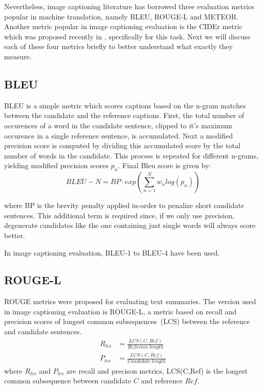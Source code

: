 Nevertheless, image captioning literature has borrowed three evaluation metrics
popular in machine translation, namely BLEU\cite{Papineni:BLEU},
ROUGE-L\cite{lin2004rouge} and METEOR\cite{denkowski-lavie:2014:Meteor}. 
Another metric popular in image captioning evaluation is the CIDEr metric which
was proposed recently in \cite{Vedantam_2015_CVPR}, specifically for this task. 
Next we will discuss each of these four metrics briefly to better understand
what exactly they measure.

\subsection*{BLEU}
BLEU is a simple metric which scores captions based on the n-gram matches
between the candidate and the reference captions.
First, the total
number of occurences of a word in the candidate sentence, clipped to it's
maximum occurence in a single reference sentence, is accumulated.
Next a modified precision score is computed by dividing this accumulated score
by the total number of words in the candidate.
This process is repeated for different n-grams, yielding modified precision
scores $p_n$. 
Final Bleu score is given by:
\begin{equation}
    BLEU-N = BP\cdot{}exp(\sum_{n=1}^{N}w_{n}log(p_n))        
\end{equation}

\noindent where BP is the brevity penalty applied in-order to penalize 
short candidate sentences.
This additional term is required since, if we only use precision, degenerate
candidates like the one containing just single words will always score better.

In image captioning evaluation, BLEU-1 to BLEU-4 have been used. 
\subsection*{ROUGE-L}
ROUGE metrics were proposed for evaluating text summaries.
The version used in image captioning evaluation is ROUGE-L, a metric based on
recall and precision scores of longest common subsequences~(LCS) between the reference
and candidate sentences.
\begin{align}
        R_{lcs} &= \frac{LCS(C,Ref)}{Refernce\ length}\\[0.75ex]
        P_{lcs} &= \frac{LCS(C,Ref)}{Candidate\ length}
\end{align}
\noindent where $R_{lcs}$ and $P_{lcs}$ are recall and precison metrics,
LCS(C,Ref) is the longest common subsequence between candidate $C$ and reference
$Ref$. 

